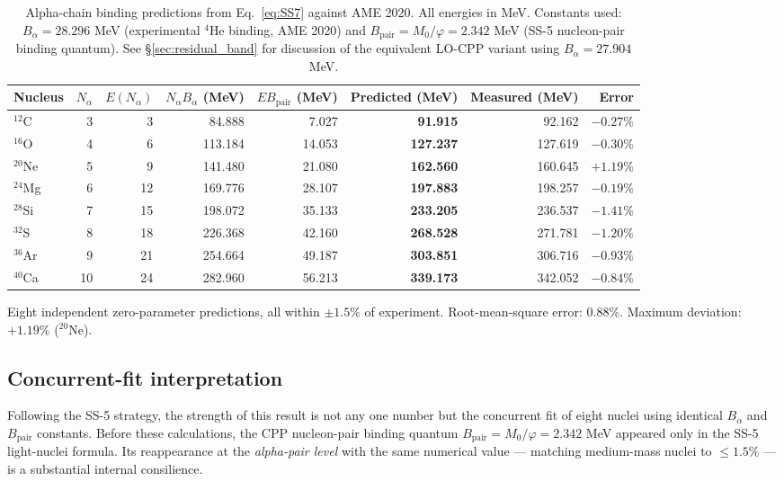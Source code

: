 \documentclass[11pt,letterpaper]{article}
\newcommand{\phig}{\varphi}
\newcommand{\Mzero}{M_0}
\newcommand{\Bpair}{B_{\mathrm{pair}}}
\newcommand{\Balpha}{B_{\alpha}}
\newcommand{\Nalpha}{N_{\alpha}}
\begin{document}
\begin{table}[H]
\centering
\caption{Alpha-chain binding predictions from Eq.~\ref{eq:SS7} against AME 2020. All energies in MeV. Constants used: $\Balpha = 28.296$ MeV (experimental ${}^4$He binding, AME 2020) and $\Bpair = M_0/\varphi = 2.342$ MeV (SS-5 nucleon-pair binding quantum). See \S\ref{sec:residual_band} for discussion of the equivalent LO-CPP variant using $\Balpha = 27.904$ MeV.}
\label{tab:SS7_predictions}
\begin{tabular}{@{}lrrrrrrr@{}}
\toprule
Nucleus & $\Nalpha$ & $E(\Nalpha)$ & $\Nalpha \Balpha$ (MeV) & $E \Bpair$ (MeV) & Predicted (MeV) & Measured (MeV) & Error \\
\midrule
${}^{12}$C   & 3  & 3  & 84.888  & 7.027  & \textbf{91.915}  & 92.162  & $-0.27\%$ \\
${}^{16}$O   & 4  & 6  & 113.184 & 14.053 & \textbf{127.237} & 127.619 & $-0.30\%$ \\
${}^{20}$Ne  & 5  & 9  & 141.480 & 21.080 & \textbf{162.560} & 160.645 & $+1.19\%$ \\
${}^{24}$Mg  & 6  & 12 & 169.776 & 28.107 & \textbf{197.883} & 198.257 & $-0.19\%$ \\
${}^{28}$Si  & 7  & 15 & 198.072 & 35.133 & \textbf{233.205} & 236.537 & $-1.41\%$ \\
${}^{32}$S   & 8  & 18 & 226.368 & 42.160 & \textbf{268.528} & 271.781 & $-1.20\%$ \\
${}^{36}$Ar  & 9  & 21 & 254.664 & 49.187 & \textbf{303.851} & 306.716 & $-0.93\%$ \\
${}^{40}$Ca  & 10 & 24 & 282.960 & 56.213 & \textbf{339.173} & 342.052 & $-0.84\%$ \\
\bottomrule
\end{tabular}
\end{table}

Eight independent zero-parameter predictions, all within $\pm 1.5\%$ of experiment. Root-mean-square error: $0.88\%$. Maximum deviation: $+1.19\%$ (${}^{20}$Ne).

\subsection{Concurrent-fit interpretation}

Following the SS-5 strategy, the strength of this result is not any one number but the concurrent fit of eight nuclei using identical $\Balpha$ and $\Bpair$ constants. Before these calculations, the CPP nucleon-pair binding quantum $\Bpair = \Mzero/\phig = 2.342$ MeV appeared only in the SS-5 light-nuclei formula. Its reappearance at the \emph{alpha-pair level} with the same numerical value --- matching medium-mass nuclei to $\leq 1.5\%$ --- is a substantial internal consilience.
\end{document}
